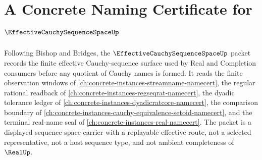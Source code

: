 \chapter{A Concrete Naming Certificate for $\EffectiveCauchySequenceSpaceUp$}
\label{ch:concrete-instances-effective-cauchy-sequence-space-namecert}

Following Bishop and Bridges, the $\EffectiveCauchySequenceSpaceUp$ packet records the finite effective Cauchy-sequence surface used by Real and Completion consumers before any quotient of Cauchy names is formed. It reads the finite observation windows of \autoref{ch:concrete-instances-streamname-namecert}, the regular rational readback of \autoref{ch:concrete-instances-regseqrat-namecert}, the dyadic tolerance ledger of \autoref{ch:concrete-instances-dyadicratcore-namecert}, the comparison boundary of \autoref{ch:concrete-instances-cauchy-equivalence-setoid-namecert}, and the terminal real-name seal of \autoref{ch:concrete-instances-real-namecert}. The packet is a displayed sequence-space carrier with a replayable effective route, not a selected representative, not a host sequence type, and not ambient completeness of $\RealUp$.

